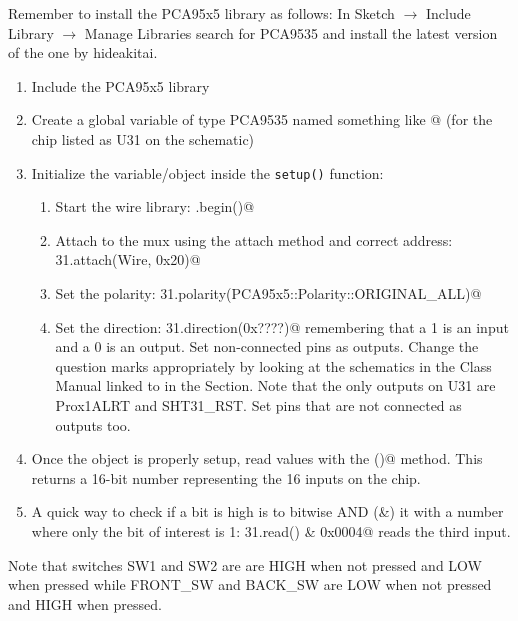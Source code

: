 Remember to install the PCA95x5 library as follows:
In Sketch $\rightarrow$ Include Library $\rightarrow$ Manage Libraries search for 
PCA9535 and install the latest version of the one by hideakitai.

\begin{enumerate}
    \item Include the PCA95x5 library
    \item Create a global variable of type PCA9535 named something like @ 
            (for the chip listed as U31 on the schematic)
    \item Initialize the variable/object inside the \lstinline|setup()| function:
    \begin{enumerate}
        \item Start the wire library: \lstinline@Wire.begin()@
        \item Attach to the mux using the attach method and correct address: 
                \lstinline@muxU31.attach(Wire, 0x20)@
        \item Set the polarity: \lstinline@muxU31.polarity(PCA95x5::Polarity::ORIGINAL_ALL)@ 
        \item Set the direction: \lstinline@muxU31.direction(0x????)@ remembering that a 1 is 
                an input and a 0 is an output. Set non-connected pins as outputs. Change the 
                question marks appropriately by looking at the schematics in the Class Manual 
                linked to in the  Section. Note that 
                the only outputs on U31 are Prox1ALRT and SHT31\_RST. Set pins that are not 
                connected as outputs too.
    \end{enumerate}
    \item Once the object is properly setup, read values with the \lstinline@read()@ 
            method. This returns a 16-bit number representing the 16 inputs on the chip.
    \item A quick way to check if a bit is high is to bitwise AND (\&) it with a number 
            where only the bit of interest is 1: \lstinline@mux31.read() & 0x0004@ reads 
            the third input.
\end{enumerate}

Note that switches SW1 and SW2 are are HIGH when not pressed and LOW 
when pressed while FRONT\_SW and BACK\_SW are LOW when not pressed and HIGH when pressed.

